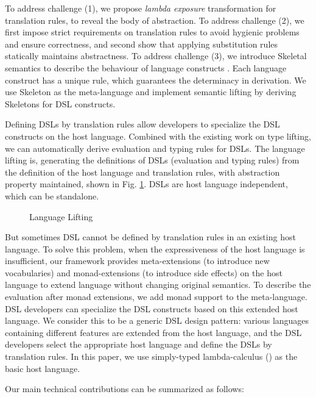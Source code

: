 To address challenge (1),
 we propose \textit{lambda exposure} transformation for translation rules,
 to reveal the body of abstraction.
To address challenge (2),
 we first impose strict requirements on translation rules to avoid hygienic problems and ensure correctness,
 and second show that applying substitution rules statically maintains abstractness.
To address challenge (3),
 we introduce Skeletal semantics to describe the behaviour of language constructs \cite{skeleton}.
 Each language construct has a unique rule, which guarantees the determinacy in derivation.
 We use Skeleton as the meta-language and implement semantic lifting by deriving Skeletons for DSL constructs.

Defining DSLs by translation rules allow developers to specialize the DSL constructs on the host language.
Combined with the existing work on type lifting, we can automatically derive evaluation and typing rules for DSLs.
The language lifting is, generating the definitions of DSLs (evaluation and typing rules) from the definition of the host language and translation rules,
 with abstraction property maintained, shown in Fig. \ref{fig:layers}.
DSLs are host language independent, which can be standalone.

\begin{figure}[t]
  
  \caption{Language Lifting}
  \label{fig:layers}
\end{figure}

But sometimes DSL cannot be defined by translation rules in an existing host language.
To solve this problem, when the expressiveness of the host language is insufficient, 
 our framework provides meta-extensions (to introduce new vocabularies) and monad-extensions (to introduce side effects) on the host language
 to extend language without changing original semantics.
To describe the evaluation after monad extensions, we add monad support to the meta-language.
DSL developers can specialize the DSL constructs based on this extended host language.
We consider this to be a generic DSL design pattern:
 various languages containing different features are extended from the host language,
 and the DSL developers select the appropriate host language and define the DSLs by translation rules.
In this paper, we use simply-typed lambda-calculus (\STLC) as the basic host language.

Our main technical contributions can be summarized as follows:

